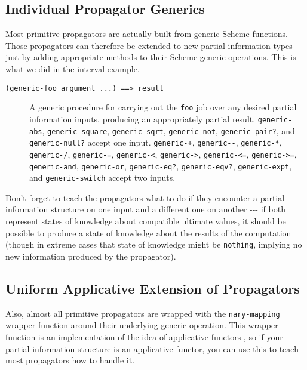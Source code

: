 \documentclass[12pt,letterpaper,english]{article}
\begin{document}

\subsection{Individual Propagator Generics}
\label{individual-propagator-generics}

Most primitive propagators are actually built from generic Scheme functions.
Those propagators can therefore be extended to new
partial information types just by adding appropriate methods to their
Scheme generic operations.  This is what we did in the interval example.
\begin{description}
\item[{\texttt{(generic-foo argument ...)  ==>  result}}] \leavevmode 
A generic procedure for carrying out the \texttt{foo} job over any
desired partial information inputs, producing an appropriately
partial result.  \texttt{generic-abs}, \texttt{generic-square},
\texttt{generic-sqrt}, \texttt{generic-not}, \texttt{generic-pair?}, and
\texttt{generic-null?} accept one input.
\texttt{generic-+}, \texttt{generic-{}-}, \texttt{generic-*}, \texttt{generic-/},
\texttt{generic-=}, \texttt{generic-<}, \texttt{generic->}, \texttt{generic-<=},
\texttt{generic->=}, \texttt{generic-and}, \texttt{generic-or}, \texttt{generic-eq?},
\texttt{generic-eqv?}, \texttt{generic-expt}, and \texttt{generic-switch} accept two inputs.

\end{description}

Don't forget to teach the propagators what to do if they encounter
a partial information structure on one input and a different one on
another -{}-{}- if both represent states of knowledge about compatible
ultimate values, it should be possible to produce a state of knowledge
about the results of the computation (though in extreme cases that
state of knowledge might be \texttt{nothing}, implying no new information
produced by the propagator).



\subsection{Uniform Applicative Extension of Propagators}
\label{uniform-applicative-extension-of-propagators}

Also, almost all primitive propagators are wrapped
with the \texttt{nary-mapping} wrapper function around their underlying
generic operation.  This wrapper function is an implementation of the
idea of applicative functors \cite{mcbride-paterson-2008-applicative-functors},
so if your partial information structure is an applicative functor, you can
use this to teach most propagators how to handle it.
\end{document}
